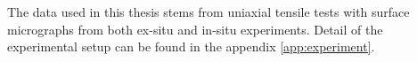 


The data used in this thesis stems from uniaxial tensile tests with surface micrographs from both ex-situ and in-situ experiments. Detail of the experimental setup can be found in the appendix \ref{app:experiment}.






